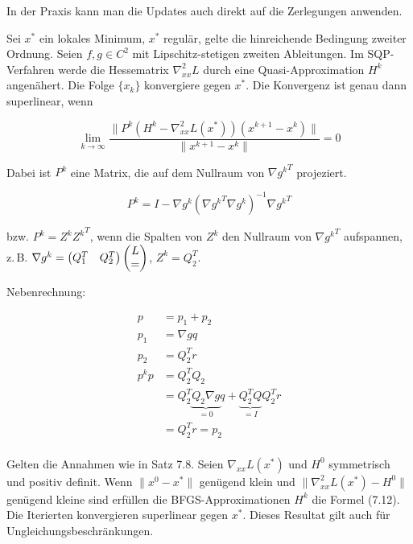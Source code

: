 In der Praxis kann man die Updates auch direkt auf die Zerlegungen anwenden.



Sei $x^*$ ein lokales Minimum, $x^*$ regulär, gelte die hinreichende Bedingung zweiter Ordnung. Seien $f,g \in C^2$ mit Lipschitz-stetigen zweiten Ableitungen. Im SQP-Verfahren werde die Hessematrix $\nabla_{xx}^2 L$ durch eine Quasi-Approximation $H^k$ angenähert. Die Folge $\{x_k\}$ konvergiere gegen $x^*$. Die Konvergenz ist genau dann superlinear, wenn

\[ \lim_{k \to \infty} \frac{\|P^k (H^k - \nabla_{xx}^2 L(x^*)) (x^{k+1} - x^k)\|}{\|x^{k+1} - x^k\|} = 0 \]

Dabei ist $P^k$ eine Matrix, die auf dem Nullraum von $\nabla {g^k}^T$ projeziert.


\[ P^k = I - \nabla g^k (\nabla {g^k}^T \nabla g^k)^{-1} \nabla {g^k}^T \]

bzw. $P^k = Z^k {Z^k}^T$, wenn die Spalten von $Z^k$ den Nullraum von ${\nabla g^k}^T$ aufspannen, z.\,B. $\nabla g^k = \begin{pmatrix} Q_1^T & Q_2^T \end{pmatrix} \begin{pmatrix} L \\ = \end{pmatrix}$, $Z^k = Q_2^T$.

Nebenrechnung:

\begin{align*}
p &= p_1 + p_2 \\
p_1 &= \nabla g q \\
p_2 &= Q_2^T r \\
p^k p &= Q_2^T Q_2  \\
&= Q_2^T \underbrace{Q_2 \nabla g}_{=0} q + \underbrace{Q_2^T Q}_{=I} Q_2^T r \\
&= Q_2^T r = p_2 \\
\end{align*}



Gelten die Annahmen wie in Satz 7.8. Seien $\nabla_{xx} L(x^*)$ und $H^0$ symmetrisch und positiv definit. Wenn $\|x^0 - x^*\|$ genügend klein und $\|\nabla_{xx}^2 L(x^*) - H^0\|$ genügend kleine sind erfüllen die BFGS-Approximationen $H^k$ die Formel (7.12). Die Iterierten konvergieren superlinear gegen $x^*$. Dieses Resultat gilt auch für Ungleichungsbeschränkungen.

